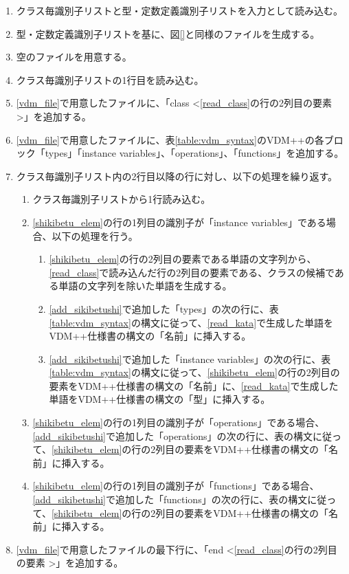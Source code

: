 \begin{enumerate}
    \item クラス毎識別子リストと型・定数定義識別子リストを入力として読み込む。
    \item 型・定数定義識別子リストを基に、図\ref{}と同様のファイルを生成する。
    \item 空のファイルを用意する。
    \label{vdm_file}
    \item クラス毎識別子リストの1行目を読み込む。
    \label{read_class}
    \item \ref{vdm_file}で用意したファイルに、「class \textless \ref{read_class}の行の2列目の要素 \textgreater」を追加する。
    \item \ref{vdm_file}で用意したファイルに、表\ref{table:vdm_syntax}のVDM++の各ブロック「types」「instance variables」、「operations」、「functions」を追加する。
    \label{add_sikibetushi}
    \item クラス毎識別子リスト内の2行目以降の行に対し、以下の処理を繰り返す。
        \begin{enumerate}
            \item クラス毎識別子リストから1行読み込む。
            \label{shikibetu_elem}
            \item \ref{shikibetu_elem}の行の1列目の識別子が「instance variables」である場合、以下の処理を行う。
                \begin{enumerate}
                    \item \ref{shikibetu_elem}の行の2列目の要素である単語の文字列から、\ref{read_class}で読み込んだ行の2列目の要素である、クラスの候補である単語の文字列を除いた単語を生成する。
                    \label{read_kata}
                    \item \ref{add_sikibetushi}で追加した「types」の次の行に、表{\ref{table:vdm_syntax}}の構文に従って、\ref{read_kata}で生成した単語をVDM++仕様書の構文の「名前」に挿入する。
                    \item \ref{add_sikibetushi}で追加した「instance variables」の次の行に、表\ref{table:vdm_syntax}の構文に従って、\ref{shikibetu_elem}の行の2列目の要素をVDM++仕様書の構文の「名前」に、\ref{read_kata}で生成した単語をVDM++仕様書の構文の「型」に挿入する。
                \end{enumerate}
            \item \ref{shikibetu_elem}の行の1列目の識別子が「operations」である場合、\ref{add_sikibetushi}で追加した「operations」の次の行に、表{}の構文に従って、\ref{shikibetu_elem}の行の2列目の要素をVDM++仕様書の構文の「名前」に挿入する。
            \item \ref{shikibetu_elem}の行の1列目の識別子が「functions」である場合、\ref{add_sikibetushi}で追加した「functions」の次の行に、表{}の構文に従って、\ref{shikibetu_elem}の行の2列目の要素をVDM++仕様書の構文の「名前」に挿入する。
        \end{enumerate}
    \item \ref{vdm_file}で用意したファイルの最下行に、「end \textless \ref{read_class}の行の2列目の要素 \textgreater」を追加する。
\end{enumerate}

